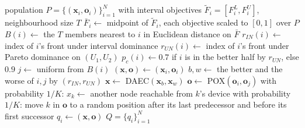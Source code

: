 \begin{algorithm}[!htbp]
\caption{\textsc{Variation}: neighbourhood mating, DAEC / POX crossover and DAG-valid mutation}
\label{alg:var}
\begin{algorithmic}[1]
\Require population $P = \{(\mathbf{x}_i, \mathbf{o}_i)\}_{i=1}^{N}$ with interval objectives $\tilde{F}_i = [F^L_i, F^U_i]$, neighbourhood size $T$
\State $\bar{F}_i \gets$ midpoint of $\tilde{F}_i$, each objective scaled to $[0, 1]$ over $P$
\State $B(i) \gets$ the $T$ members nearest to $i$ in Euclidean distance on $\bar{F}$
\State $r_{IN}(i) \gets$ index of $i$'s front under interval dominance
\State $r_{UN}(i) \gets$ index of $i$'s front under Pareto dominance on $(U_1, U_2)$ 
\State $p_c(i) \gets 0.7$ if $i$ is in the better half by $r_{UN}$, else $0.9$
  \State $j \gets$ uniform from $B(i)$
  \State $(\mathbf{x}, \mathbf{o}) \gets (\mathbf{x}_i, \mathbf{o}_i)$
    \State $b, w \gets$ the better and the worse of $i, j$ by $(r_{IN}, r_{UN})$
    \State $\mathbf{x} \gets$ DAEC$(\mathbf{x}_b, \mathbf{x}_w)$ 
    \State $\mathbf{o} \gets$ POX$(\mathbf{o}_i, \mathbf{o}_j)$ 
  \EndIf
    \State with probability $1/K$: $x_k \gets$ another node reachable from $k$'s device
    \State with probability $1/K$: move $k$ in $\mathbf{o}$ to a random position after its last predecessor and before its first successor
  \EndFor
  \State $q_i \gets (\mathbf{x}, \mathbf{o})$ 
\EndFor
\State \Return $Q = \{q_i\}_{i=1}^{N}$
\end{algorithmic}
\end{algorithm}

